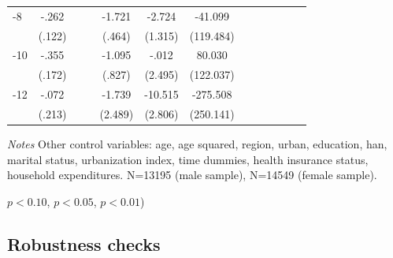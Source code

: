 \begin{table}[hp]
\begin{adjustbox}{max width=\linewidth}
\begin{threeparttable}
{\begin{tabular}{l*{6}{S
S}}
-8             &    -.262\sym{**} &         &         &   -1.721\sym{***}&   -2.724\sym{**} &  -41.099         \\
                &   (.122)         &         &         &   (.464)         &  (1.315)         &(119.484)         \\
-10            &    -.355\sym{**} &         &         &   -1.095         &    -.012         &   80.030         \\
                &   (.172)         &         &         &   (.827)         &  (2.495)         &(122.037)         \\
-12           &    -.072         &         &         &   -1.739         &  -10.515\sym{***}& -275.508         \\
                &   (.213)         &         &         &  (2.489)         &  (2.806)         &(250.141)         \\
\bottomrule
\end{tabular}
\begin{tablenotes}
\item \textit{Notes} Other control variables: age, age squared, region, urban, education, han, marital status, urbanization index, time dummies, health insurance status, household expenditures. N=13195 (male sample), N=14549 (female sample).
\item \sym{*} \(p<0.10\), \sym{**} \(p<0.05\), \sym{***} \(p<0.01\))
\end{tablenotes}
}
\end{threeparttable}
\end{adjustbox}
\end{table}
\FloatBarrier

\subsection*{Robustness checks}

